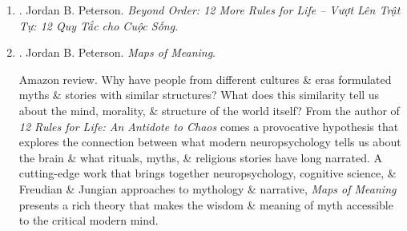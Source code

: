 \documentclass{article}
\begin{document}
\begin{enumerate}
	\item \cite{Peterson_beyond_order_VN}. {\sc Jordan B. Peterson}. {\it Beyond Order: 12 More Rules for Life -- Vượt Lên Trật Tự: 12 Quy Tắc cho Cuộc Sống}.\hfill{\sf[done]}
	
	\item \cite{Peterson_map_meaning}. {\sc Jordan B. Peterson}. {\it Maps of Meaning}. {}\hfill{\sf[reading]}
	
	{\sf Amazon review.} Why have people from different cultures \& eras formulated myths \& stories with similar structures? What does this similarity tell us about the mind, morality, \& structure of the world itself? From the author of {\it12 Rules for Life: An Antidote to Chaos} comes a provocative hypothesis that explores the connection between what modern neuropsychology tells us about the brain \& what rituals, myths, \& religious stories have long narrated. A cutting-edge work that brings together neuropsychology, cognitive science, \& Freudian \& Jungian approaches to mythology \& narrative, {\it Maps of Meaning} presents a rich theory that makes the wisdom \& meaning of myth accessible to the critical modern mind.
	

\end{enumerate}
\end{document}
